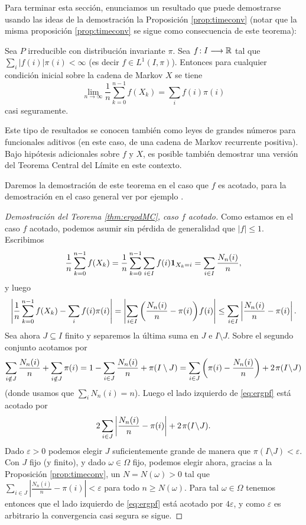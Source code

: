 Para terminar esta sección, enunciamos un resultado que puede demostrarse usando las ideas de la demostración la Proposición \ref{prop:timeconv} (notar que la misma proposición \ref{prop:timeconv} se sigue como consecuencia de este teorema):

\begin{thm}\label{thm:ergodMC}
Sea $P$ irreducible con distribución invariante $\pi$.
Sea $f\!:I\longrightarrow\mathbb{R}$ tal que $\sum_i|f(i)|\pi(i)<\infty$ (es decir $f\in L^1(I,\pi)$).
Entonces para cualquier condición inicial sobre la cadena de Markov $X$ se tiene
\[\lim_{n\to\infty}\frac1{n}\sum_{k=0}^{n-1}f(X_k)=\sum_if(i)\pi(i)\]
casi seguramente.
\end{thm}

Este tipo de resultados se conocen también como leyes de grandes números para funcionales aditivos (en este caso, de una cadena de Markov recurrente positiva).
Bajo hipótesis adicionales sobre $f$ y $X$, es posible también demostrar una versión del Teorema Central del Límite en este contexto.

Daremos la demostración de este teorema en el caso que $f$ es acotado, para la demostración en el caso general ver por ejemplo \cite[Ejer. 6.6.4]{durrett}.

\begin{proof}[Demostración del Teorema \ref{thm:ergodMC}, caso $f$ acotado]
Como estamos en el caso $f$ acotado, podemos asumir sin pérdida de generalidad que $|f|\leq1$.
Escribimos
\[\frac1{n}\sum_{k=0}^{n-1}f(X_k)=\frac1{n}\sum_{k=0}^{n-1}\sum_{i\in I}f(i)\mathbf{1}_{X_k=i}=\sum_{i\in I}\frac{N_n(i)}{n},\]
y luego
\begin{equation}\label{eq:ergpf}
\left|\frac1{n}\sum_{k=0}^{n-1}f(X_k)-\sum_if(i)\pi(i)\right|
=\left|\sum_{i\in I}\left(\frac{N_n(i)}{n}-\pi(i)\right)\hspace{-0.1em} f(i)\right|
\leq\sum_{i\in I}\left|\frac{N_n(i)}{n}-\pi(i)\right|.
\end{equation}
Sea ahora $J\subseteq I$ finito y separemos la última suma en $J$ e $I\!\setminus\!J$.
Sobre el segundo conjunto acotamos por
\[\sum_{i\notin J}\frac{N_n(i)}{n}+\sum_{i\notin J}\pi(i)=1-\sum_{i\in J}\frac{N_n(i)}{n}+\pi(I\setminus J)=\sum_{i\in J}\left(\pi(i)-\frac{N_n(i)}{n}\right)+2\hspace{0.1em}\pi(I\!\setminus\!J)\]
(donde usamos que $\sum_iN_n(i)=n$).
Luego el lado izquierdo de \eqref{eq:ergpf} está acotado por
\[2\sum_{i\in J}\left|\frac{N_n(i)}{n}-\pi(i)\right|+2\hspace{0.1em}\pi(I\!\setminus\!J).\]
Dado $\varepsilon>0$ podemos elegir $J$ suficientemente grande de manera que $\pi(I\!\setminus\!J)<\varepsilon$.
Con $J$ fijo (y finito), y dado $\omega\in\Omega$ fijo, podemos elegir ahora, gracias a la Proposición \ref{prop:timeconv}, un $N=N(\omega)>0$ tal que $\sum_{i\in J}\left|\frac{N_n(i)}{n}-\pi(i)\right|<\varepsilon$ para todo $n\geq N(\omega)$.
Para tal $\omega\in\Omega$ tenemos entonces que el lado izquierdo de \eqref{eq:ergpf} está acotado por $4\varepsilon$, y como $\varepsilon$ es arbitrario la convergencia casi segura se sigue.
\end{proof}

